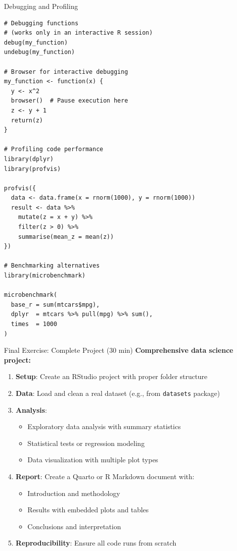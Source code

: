 \documentclass[aspectratio=169]{beamer}
\begin{document}
\begin{frame}[fragile]{Debugging and Profiling}
\begin{lstlisting}
# Debugging functions
# (works only in an interactive R session)
debug(my_function)    
undebug(my_function)

# Browser for interactive debugging
my_function <- function(x) {
  y <- x^2
  browser()  # Pause execution here
  z <- y + 1
  return(z)
}

# Profiling code performance
library(dplyr)
library(profvis)

profvis({
  data <- data.frame(x = rnorm(1000), y = rnorm(1000))
  result <- data %>%
    mutate(z = x + y) %>%
    filter(z > 0) %>%
    summarise(mean_z = mean(z))
})

# Benchmarking alternatives
library(microbenchmark)

microbenchmark(
  base_r = sum(mtcars$mpg),
  dplyr  = mtcars %>% pull(mpg) %>% sum(),
  times  = 1000
)
\end{lstlisting}
\end{frame}


\begin{frame}{Final Exercise: Complete Project (30 min)}
  \textbf{Comprehensive data science project:}
  \begin{enumerate}
    \item \textbf{Setup}: Create an RStudio project with proper folder structure
    \item \textbf{Data}: Load and clean a real dataset (e.g., from \texttt{datasets} package)
    \item \textbf{Analysis}:
      \begin{itemize}
        \item Exploratory data analysis with summary statistics
        \item Statistical tests or regression modeling
        \item Data visualization with multiple plot types
      \end{itemize}
    \item \textbf{Report}: Create a Quarto or R Markdown document with:
      \begin{itemize}
        \item Introduction and methodology
        \item Results with embedded plots and tables
        \item Conclusions and interpretation
      \end{itemize}
    \item \textbf{Reproducibility}: Ensure all code runs from scratch
  \end{enumerate}
\end{frame}
\end{document}
